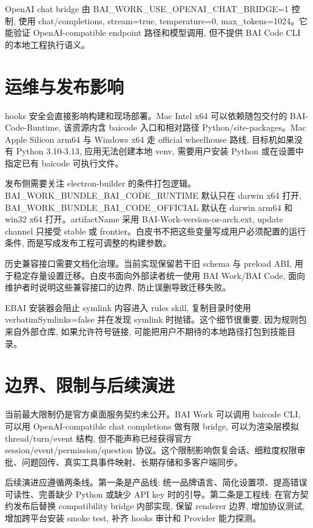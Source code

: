 OpenAI chat bridge 由 BAI\_WORK\_USE\_OPENAI\_CHAT\_BRIDGE=1 控制, 使用 chat/completions, stream=true, temperature=0, max\_tokens=1024。它能验证 OpenAI-compatible endpoint 路径和模型调用, 但不提供 BAI Code CLI 的本地工程执行语义。

\section{运维与发布影响}
hooks 安全会直接影响构建和现场部署。Mac Intel x64 可以依赖随包交付的 BAI-Code-Runtime, 该资源内含 baicode 入口和相对路径 Python/site-packages。Mac Apple Silicon arm64 与 Windows x64 走 official wheelhouse 路线, 目标机如果没有 Python 3.10-3.13, 应用无法创建本地 venv, 需要用户安装 Python 或在设置中指定已有 baicode 可执行文件。

发布侧需要关注 electron-builder 的条件打包逻辑。BAI\_WORK\_BUNDLE\_BAI\_CODE\_RUNTIME 默认只在 darwin x64 打开, BAI\_WORK\_BUNDLE\_BAI\_CODE\_OFFICIAL 默认在 darwin arm64 和 win32 x64 打开。artifactName 采用 BAI-Work-{version}-{os}-{arch}.{ext}, update channel 只接受 stable 或 frontier。白皮书不把这些变量写成用户必须配置的运行条件, 而是写成发布工程可调整的构建参数。

历史兼容接口需要文档化治理。当前实现保留若干旧 schema 与 preload ABI, 用于稳定存量设置迁移。白皮书面向外部读者统一使用 BAI Work/BAI Code, 面向维护者时说明这些兼容接口的边界, 防止误删导致迁移失败。

EBAI 安装器会阻止 symlink 内容进入 rules skill, 复制目录时使用 verbatimSymlinks=false 并在发现 symlink 时抛错。这个细节很重要, 因为规则包来自外部仓库, 如果允许符号链接, 可能把用户不期待的本地路径打包到技能目录。

\section{边界、限制与后续演进}
当前最大限制仍是官方桌面服务契约未公开。BAI Work 可以调用 baicode CLI, 可以用 OpenAI-compatible chat completions 做有限 bridge, 可以为渲染层模拟 thread/turn/event 结构, 但不能声称已经获得官方 session/event/permission/question 协议。这个限制影响恢复会话、细粒度权限审批、问题回传、真实工具事件映射、长期存储和多客户端同步。

后续演进应遵循两条线。第一条是产品线: 统一品牌语言、简化设置项、提高错误可读性、完善缺少 Python 或缺少 API key 时的引导。第二条是工程线: 在官方契约发布后替换 compatibility bridge 内部实现, 保留 renderer 边界, 增加协议测试, 增加跨平台安装 smoke test, 补齐 hooks 审计和 Provider 能力探测。

